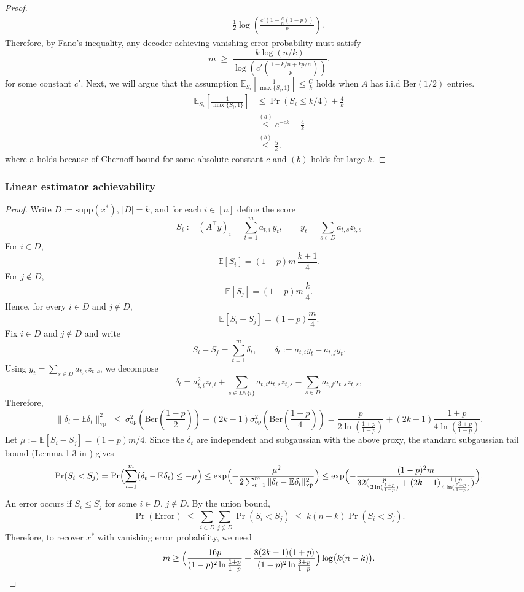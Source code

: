 \documentclass{article}
\newcommand{\E}{\mathbb{E}}
\newcommand{\Ber}{\mathrm{Ber}}
\newcommand{\supp}{\mathrm{supp}}
\begin{document}
\begin{proof}
\begin{align*}
& = \frac12\log\left(\frac{c'\left(1-\frac{k}{n}(1-p)\right)}{p}\right).
\end{align*}
Therefore, by Fano's inequality,
any decoder achieving vanishing error probability must satisfy
\[
m \;\ge\; \frac{k\log(n/k)}{\log\left(c'\left(\frac{1-k/n+kp/n}{p}\right)\right)}.
\]
for some constant $c'$.
Next, we will argue that the assumption $\E_{S_i}\!\left[\frac{1}{\max\{S_i, 1\}} \right]\leq \frac{C}{k}$ holds when $A$ has i.i.d  $\Ber(1/2)$ entries.
\begin{align*}
\E_{S_i}\!\left[\frac{1}{\max\{S_i, 1\}} \right]&\leq \Pr(S_i\leq k/4) + \frac{4}{k}\\
& \stackrel{(a)}{\leq} e^{-ck} + \frac{4}{k}\\
&\stackrel{(b)}{\leq} \frac{5}{k}.
\end{align*} where a holds because of Chernoff bound for some absolute constant $c$ and $(b)$ holds for large $k$.
\end{proof}
\subsubsection{Linear estimator achievability}
\begin{proof}
Write $D := \supp(x^*)$, $|D|=k$, and for each $i\in[n]$ define the score
\[
S_i := (A^\top y)_i
= \sum_{t=1}^m a_{t,i}\,y_t,
\qquad
y_t = \sum_{s\in D} a_{t,s} z_{t,s}
\]
For $i\in D$,
\[
\mathbb{E}[S_i] = (1-p)m\,\frac{k+1}{4}.
\]
For $j\notin D$,
\[
\mathbb{E}[S_j] = (1-p)m\,\frac{k}{4}.
\]
Hence, for every $i\in D$ and $j\notin D$,
\[
\mathbb{E}[S_i - S_j] = (1-p)\frac{m}{4}.
\]
Fix $i\in D$ and $j\notin D$ and write
\[
S_i - S_j = \sum_{t=1}^m \delta_t,
\qquad
\delta_t := a_{t,i}y_t - a_{t,j}y_t.
\]
Using $y_t = \sum_{s\in D} a_{t,s} z_{t,s}$, we decompose
\[
\delta_t 
= a_{t,i}^2z_{t,i} 
  + \sum_{s\in D\setminus\{i\}} a_{t,i}a_{t,s}z_{t,s}
  - \sum_{s\in D} a_{t,j}a_{t,s}z_{t,s},
\]
Therefore,
\[
\|\delta_t - \mathbb{E}\delta_t\|^2_\text{vp}
\;\le\;
\sigma_{\text{op}}^2(\Ber(\frac{1-p}{2})) + (2k-1) \sigma_{\text{op}}^2(\Ber(\frac{1-p}{4}))
=\frac{p}{2\ln(\frac{1+p}{1-p})} + (2k-1)\frac{1+p}{4\ln(\frac{3+p}{1-p})}.
\]
Let $\mu := \mathbb{E}[S_i - S_j] = (1-p)m/4$.  
Since the $\delta_t$ are independent and subgaussian with the above proxy, the standard subgaussian tail bound (Lemma 1.3 in \cite{rigollet_chapter_nodate}) gives
\[
\Pr(S_i < S_j)
= \Pr\Bigl(\sum_{t=1}^m (\delta_t - \mathbb{E}\delta_t) \le -\mu\Bigr)
\le 
\exp\Bigl(
  - \frac{\mu^2}{2 \sum_{t=1}^m \|\delta_t - \mathbb{E}\delta_t\|^2_\text{vp}}
\Bigr)
\le
\exp\Bigl(
  - \frac{(1-p)^2 m}{32(\frac{p}{2\ln(\frac{1+p}{1-p})} + (2k-1)\frac{1+p}{4\ln(\frac{3+p}{1-p})})}
\Bigr).
\]
An error occurs if $S_i \le S_j$ for some $i\in D$, $j\notin D$.  
By the union bound,
\[
\Pr(\text{Error})
\;\le\;
\sum_{i\in D}\sum_{j\notin D} \Pr(S_i < S_j)
\;\le\;
k(n-k)
\Pr(S_i < S_j).
\]
Therefore, to recover $x^*$ with vanishing error probability, we need 
\[
m\ge \Bigl(
\frac{16p}{(1-p)^2 \ln\frac{1+p}{1-p}}
+
\frac{8(2k-1)(1+p)}{(1-p)^2 \ln\frac{3+p}{1-p}}\Bigr) \log\bigl(k(n-k)\bigr).
\]
\end{proof}
\end{document}
